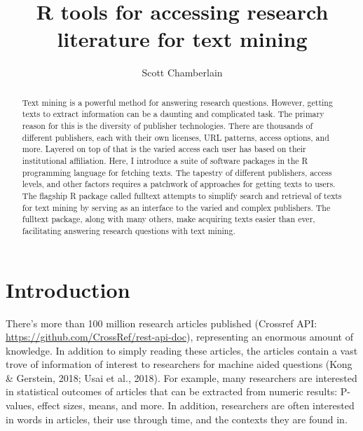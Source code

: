 \documentclass[author-year, review, 11pt]{components/elsarticle} %
\begin{document}
\begin{frontmatter}

  \title{R tools for accessing research literature for text mining}
    \author[cstar]{Scott Chamberlain}
      \address[cstar]{rOpenSci, Museum of Paleontology, University of California, Berkeley,
CA, USA}
  
  \begin{abstract}
  Text mining is a powerful method for answering research questions.
  However, getting texts to extract information can be a daunting and
  complicated task. The primary reason for this is the diversity of
  publisher technologies. There are thousands of different publishers,
  each with their own licenses, URL patterns, access options, and more.
  Layered on top of that is the varied access each user has based on their
  institutional affiliation. Here, I introduce a suite of software
  packages in the R programming language for fetching texts. The tapestry
  of different publishers, access levels, and other factors requires a
  patchwork of approaches for getting texts to users. The flagship R
  package called fulltext attempts to simplify search and retrieval of
  texts for text mining by serving as an interface to the varied and
  complex publishers. The fulltext package, along with many others, make
  acquiring texts easier than ever, facilitating answering research
  questions with text mining.
  \end{abstract}
  
 \end{frontmatter}


\newpage

\hypertarget{introduction}{%
\section{Introduction}\label{introduction}}

There's more than 100 million research articles published (Crossref API:
\url{https://github.com/CrossRef/rest-api-doc}), representing an
enormous amount of knowledge. In addition to simply reading these
articles, the articles contain a vast trove of information of interest
to researchers for machine aided questions (Kong \& Gerstein, 2018; Usai
et al., 2018). For example, many researchers are interested in
statistical outcomes of articles that can be extracted from numeric
results: P-values, effect sizes, means, and more. In addition,
researchers are often interested in words in articles, their use through
time, and the contexts they are found in.
\end{document}
